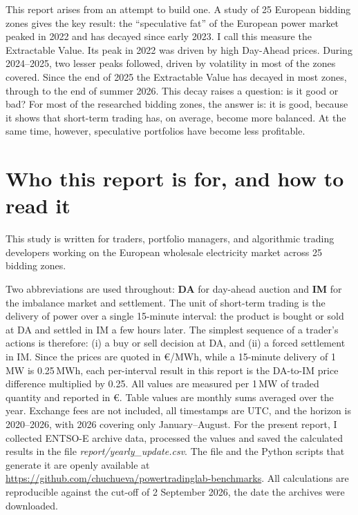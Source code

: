 \documentclass[11pt,a4paper]{article}
\begin{document}
This report arises from an attempt to build one. A study of 25 European bidding zones gives the key result: the ``speculative fat'' of the European power market peaked in 2022 and has decayed since early 2023. I call this measure the Extractable Value. Its peak in 2022 was driven by high Day-Ahead prices. During 2024--2025, two lesser peaks followed, driven by volatility in most of the zones covered. Since the end of 2025 the Extractable Value has decayed in most zones, through to the end of summer 2026. This decay raises a question: is it good or bad? For most of the researched bidding zones, the answer is: it is good, because it shows that short-term trading has, on average, become more balanced. At the same time, however, speculative portfolios have become less profitable.

\newpage
\tableofcontents

\vspace{1em}

\section*{Who this report is for, and how to read it}
This study is written for traders, portfolio managers, and algorithmic trading developers working on the European wholesale electricity market across 25 bidding zones.

\vspace{0.6em}
Two abbreviations are used throughout: \textbf{DA} for day-ahead auction and \textbf{IM} for the imbalance market and settlement. The unit of short-term trading is the delivery of power over a single 15-minute interval: the product is bought or sold at DA and settled in IM a few hours later. The simplest sequence of a trader's actions is therefore: (i) a buy or sell decision at DA, and (ii) a forced settlement in IM. Since the prices are quoted in \euro/MWh, while a 15-minute delivery of 1\,MW is 0.25\,MWh, each per-interval result in this report is the DA-to-IM price difference multiplied by 0.25. All values are measured per 1\,MW of traded quantity and reported in \euro. Table values are monthly sums averaged over the year. Exchange fees are not included, all timestamps are UTC, and the horizon is 2020--2026, with 2026 covering only January--August. For the present report, I collected ENTSO-E archive data, processed the values and saved the calculated results in the file \textit{report/yearly\_update.csv}. The file and the Python scripts that generate it are openly available at \url{https://github.com/chuchueva/powertradinglab-benchmarks}. All calculations are reproducible against the cut-off of 2 September 2026, the date the archives were downloaded.
\end{document}
